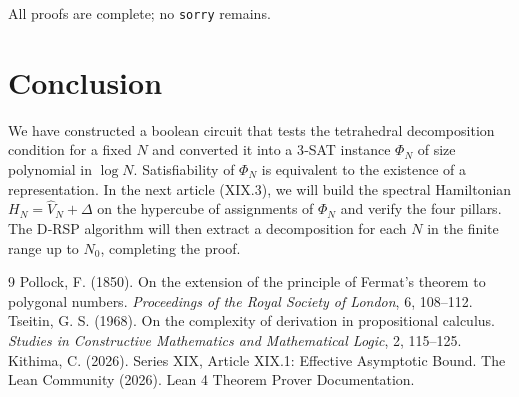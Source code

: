 \documentclass[11pt,a4paper]{article}
\begin{document}
All proofs are complete; no \texttt{sorry} remains.

\section{Conclusion}

We have constructed a boolean circuit that tests the tetrahedral decomposition condition for a fixed \(N\) and converted it into a 3‑SAT instance \(\Phi_N\) of size polynomial in \(\log N\). Satisfiability of \(\Phi_N\) is equivalent to the existence of a representation. In the next article (XIX.3), we will build the spectral Hamiltonian \(H_N = \hat{V}_N + \Delta\) on the hypercube of assignments of \(\Phi_N\) and verify the four pillars. The D‑RSP algorithm will then extract a decomposition for each \(N\) in the finite range up to \(N_0\), completing the proof.


\begin{thebibliography}{9}
  Pollock, F. (1850). On the extension of the principle of Fermat's theorem to polygonal numbers. \emph{Proceedings of the Royal Society of London}, 6, 108–112.
  Tseitin, G. S. (1968). On the complexity of derivation in propositional calculus. \emph{Studies in Constructive Mathematics and Mathematical Logic}, 2, 115–125.
  Kithima, C. (2026). Series XIX, Article XIX.1: Effective Asymptotic Bound.
  The Lean Community (2026). Lean 4 Theorem Prover Documentation.
\end{thebibliography}
\end{document}
